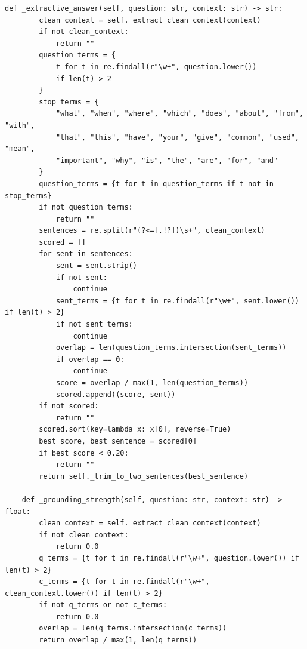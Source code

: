 \documentclass[12pt,a4paper]{article}
\begin{document}
\begin{lstlisting}[caption={tutor\_engine.py}]
    def _extractive_answer(self, question: str, context: str) -> str:
        clean_context = self._extract_clean_context(context)
        if not clean_context:
            return ""
        question_terms = {
            t for t in re.findall(r"\w+", question.lower())
            if len(t) > 2
        }
        stop_terms = {
            "what", "when", "where", "which", "does", "about", "from", "with",
            "that", "this", "have", "your", "give", "common", "used", "mean",
            "important", "why", "is", "the", "are", "for", "and"
        }
        question_terms = {t for t in question_terms if t not in stop_terms}
        if not question_terms:
            return ""
        sentences = re.split(r"(?<=[.!?])\s+", clean_context)
        scored = []
        for sent in sentences:
            sent = sent.strip()
            if not sent:
                continue
            sent_terms = {t for t in re.findall(r"\w+", sent.lower()) if len(t) > 2}
            if not sent_terms:
                continue
            overlap = len(question_terms.intersection(sent_terms))
            if overlap == 0:
                continue
            score = overlap / max(1, len(question_terms))
            scored.append((score, sent))
        if not scored:
            return ""
        scored.sort(key=lambda x: x[0], reverse=True)
        best_score, best_sentence = scored[0]
        if best_score < 0.20:
            return ""
        return self._trim_to_two_sentences(best_sentence)

    def _grounding_strength(self, question: str, context: str) -> float:
        clean_context = self._extract_clean_context(context)
        if not clean_context:
            return 0.0
        q_terms = {t for t in re.findall(r"\w+", question.lower()) if len(t) > 2}
        c_terms = {t for t in re.findall(r"\w+", clean_context.lower()) if len(t) > 2}
        if not q_terms or not c_terms:
            return 0.0
        overlap = len(q_terms.intersection(c_terms))
        return overlap / max(1, len(q_terms))


\end{lstlisting}
\end{document}
